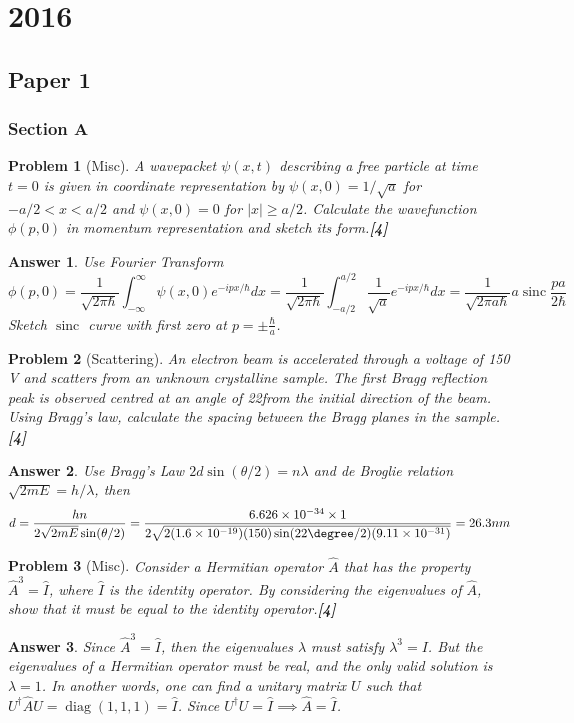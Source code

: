 \documentclass[a4paper]{article}
\DeclareMathOperator{\sinc}{sinc}
\DeclareMathOperator{\diag}{diag}
\newtheorem{ans}{Answer}[subsection]
\theoremstyle{new}
\newtheorem{qns}{Problem}[subsection]
\begin{document}
\section{2016}
\subsection{Paper 1}
\subsubsection{Section A}
\begin{qns}[Misc]
A wavepacket $\psi(x,t)$ describing a free particle at time $t=0$ is given in coordinate representation by $\psi(x,0)=1/\sqrt{a}$ for $-a/2<x<a/2$ and $\psi(x,0)=0$ for $|x|\geq a/2$. Calculate the wavefunction $\phi(p,0)$ in momentum representation and sketch its form.\hfill\textbf{[4]}
\end{qns}
\begin{ans}
Use Fourier Transform
$$\phi(p,0)=\frac{1}{\sqrt{2\pi\hbar}}\int_{-\infty}^\infty\psi(x,0)e^{-ipx/\hbar}dx=\frac{1}{\sqrt{2\pi\hbar}}\int_{-a/2}^{a/2}\frac{1}{\sqrt{a}}e^{-ipx/\hbar}dx=\frac{1}{\sqrt{2\pi a\hbar}}a\sinc\frac{pa}{2\hbar}$$
Sketch $\sinc$ curve with first zero at $p=\pm\frac{\hbar}{a}$.
\end{ans}
\begin{qns}[Scattering]
An electron beam is accelerated through a voltage of 150 V and scatters from an unknown crystalline sample. The first Bragg reflection peak is observed centred at an angle of 22\degree from the initial direction of the beam. Using Bragg's law, calculate the spacing between the Bragg planes in the sample.\hfill\textbf{[4]}
\end{qns}
\begin{ans}
Use Bragg's Law $2d\sin(\theta/2)=n\lambda$ and de Broglie relation $\sqrt{2mE}=h/\lambda$, then
$$d=\frac{hn}{2\sqrt{2mE}\sin(\theta/2)}=\frac{6.626\times10^{-34}\times 1}{2\sqrt{2(1.6\times10^{-19})(150)\sin(22\degree/2)(9.11\times10^{-31})}}=26.3 nm$$
\end{ans}
\begin{qns}[Misc]
Consider a Hermitian operator $\hat{A}$ that has the property $\hat{A}^3=\hat{I}$, where $\hat{I}$ is the identity operator. By considering the eigenvalues of $\hat{A}$, show that it must be equal to the identity operator.\hfill\textbf{[4]}
\end{qns}
\begin{ans}
Since $\hat{A}^3=\hat{I}$, then the eigenvalues $\lambda$ must satisfy $\lambda^3=I$. But the eigenvalues of a Hermitian operator must be real, and the only valid solution is $\lambda=1$. In another words, one can find a unitary matrix $U$ such that $U^\dag\hat{A}U=\diag(1,1,1)=\hat{I}$. Since $U^\dag U=\hat{I}\implies\hat{A}=\hat{I}$. 
\end{ans}
\end{document}

